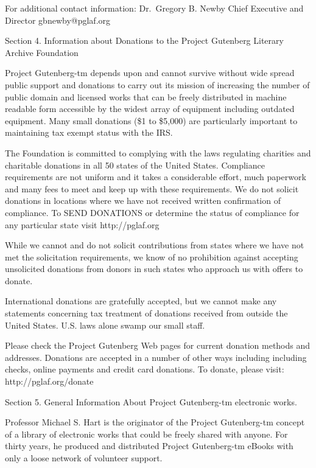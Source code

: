 \documentclass[12pt,oneside]{scrbook}
\begin{document}
  For additional contact information: Dr.~Gregory B. Newby Chief Executive
  and Director gbnewby@pglaf.org
  
  Section 4. Information about Donations to the Project Gutenberg Literary
  Archive Foundation
  
  Project Gutenberg-tm depends upon and cannot survive without wide spread
  public support and donations to carry out its mission of increasing the
  number of public domain and licensed works that can be freely
  distributed in machine readable form accessible by the widest array of
  equipment including outdated equipment. Many small donations (\$1 to
  \$5,000) are particularly important to maintaining tax exempt status
  with the IRS.
  
  The Foundation is committed to complying with the laws regulating
  charities and charitable donations in all 50 states of the United
  States. Compliance requirements are not uniform and it takes a
  considerable effort, much paperwork and many fees to meet and keep up
  with these requirements. We do not solicit donations in locations where
  we have not received written confirmation of compliance. To SEND
  DONATIONS or determine the status of compliance for any particular state
  visit http://pglaf.org
  
  While we cannot and do not solicit contributions from states where we
  have not met the solicitation requirements, we know of no prohibition
  against accepting unsolicited donations from donors in such states who
  approach us with offers to donate.
  
  International donations are gratefully accepted, but we cannot make any
  statements concerning tax treatment of donations received from outside
  the United States. U.S. laws alone swamp our small staff.
  
  Please check the Project Gutenberg Web pages for current donation
  methods and addresses. Donations are accepted in a number of other ways
  including including checks, online payments and credit card donations.
  To donate, please visit: http://pglaf.org/donate
  
  Section 5. General Information About Project Gutenberg-tm electronic
  works.
  
  Professor Michael S. Hart is the originator of the Project Gutenberg-tm
  concept of a library of electronic works that could be freely shared
  with anyone. For thirty years, he produced and distributed Project
  Gutenberg-tm eBooks with only a loose network of volunteer support.
  
\end{document}
